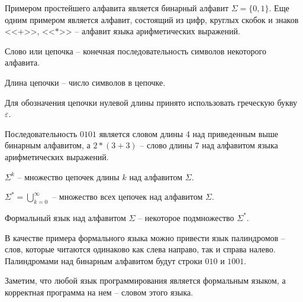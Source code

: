 Примером простейшего алфавита является бинарный алфавит $\Sigma = \{0, 1\}$.
Еще одним примером является алфавит, состоящий из цифр, круглых скобок и знаков <<$+$>>, <<$*$>> -- алфавит языка арифметических выражений.
\begin{definition}
Слово или цепочка -- конечная последовательность символов некоторого алфавита.
\end{definition}
\begin{definition}
Длина цепочки -- число символов в цепочке.
\end{definition}
Для обозначения цепочки нулевой длины принято использовать греческую букву $\varepsilon$.

Последовательность $0101$ является словом длины 4 над приведенным выше бинарным алфавитом,
а $2 * (3 + 3)$ -- слово длины 7 над алфавитом языка арифметических выражений.
\begin{definition}
$\Sigma^k$ -- множество цепочек длины $k$ над алфавитом $\Sigma$.
\end{definition}
\begin{definition}
$\Sigma^* = \bigcup\limits_{k=0}^\infty$ -- множество всех цепочек над алфавитом $\Sigma$.
\end{definition}
\begin{definition}
Формальный язык над алфавитом $\Sigma$ -- некоторое подмножество $\Sigma^*$.
\end{definition}
В качестве примера формального языка можно привести язык палиндромов -- слов, которые читаются одинаково как слева направо, так и справа налево.
Палиндромами над бинарным алфавитом будут строки $010$ и $1001$.

Заметим, что любой язык программирования является формальным языком, а корректная программа на нем -- словом этого языка.
